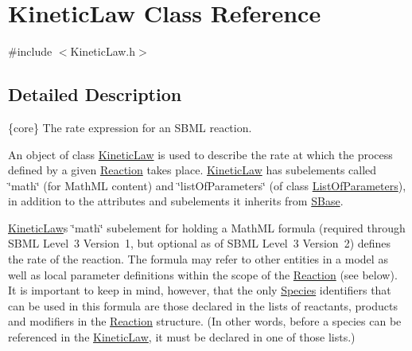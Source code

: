 \hypertarget{class_kinetic_law}{}\section{Kinetic\+Law Class Reference}
\label{class_kinetic_law}


{\ttfamily \#include $<$Kinetic\+Law.\+h$>$}



\subsection{Detailed Description}
\{core\} The rate expression for an S\+B\+ML reaction.

An object of class \hyperlink{class_kinetic_law}{Kinetic\+Law} is used to describe the rate at which the process defined by a given \hyperlink{class_reaction}{Reaction} takes place. \hyperlink{class_kinetic_law}{Kinetic\+Law} has subelements called \char`\"{}math\char`\"{} (for Math\+ML content) and \char`\"{}list\+Of\+Parameters\char`\"{} (of class \hyperlink{class_list_of_parameters}{List\+Of\+Parameters}), in addition to the attributes and subelements it inherits from \hyperlink{class_s_base}{S\+Base}.

\hyperlink{class_kinetic_law}{Kinetic\+Law}\textquotesingle{}s \char`\"{}math\char`\"{} subelement for holding a Math\+ML formula (required through S\+B\+ML Level~3 Version~1, but optional as of S\+B\+ML Level~3 Version~2) defines the rate of the reaction. The formula may refer to other entities in a model as well as local parameter definitions within the scope of the \hyperlink{class_reaction}{Reaction} (see below). It is important to keep in mind, however, that the only \hyperlink{class_species}{Species} identifiers that can be used in this formula are those declared in the lists of reactants, products and modifiers in the \hyperlink{class_reaction}{Reaction} structure. (In other words, before a species can be referenced in the \hyperlink{class_kinetic_law}{Kinetic\+Law}, it must be declared in one of those lists.)

